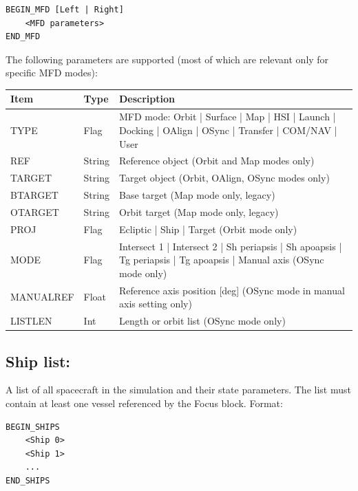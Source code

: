 \documentclass[Orbiter Developer Manual.tex]{subfiles}
\begin{document}
\begin{lstlisting}[language=OSFS]
BEGIN_MFD [Left | Right]
	<MFD parameters>
END_MFD
\end{lstlisting}

\noindent
The following parameters are supported (most of which are relevant only for specific MFD modes):

\begin{table}[H]
	\centering
	\begin{tabularx}{\textwidth}{ |l|l|X| }
	\hline\rule{0pt}{2ex}
	\textbf{Item} & \textbf{Type} & \textbf{Description}\\
	\hline\rule{0pt}{2ex}
	TYPE & Flag & MFD mode: Orbit | Surface | Map | HSI | Launch | Docking | OAlign | OSync | Transfer | COM/NAV | User\\
	\hline\rule{0pt}{2ex}
	REF & String & Reference object (Orbit and Map modes only)\\
	\hline\rule{0pt}{2ex}
	TARGET & String & Target object (Orbit, OAlign, OSync modes only)\\
	\hline\rule{0pt}{2ex}
	BTARGET & String & Base target (Map mode only, legacy)\\
	\hline\rule{0pt}{2ex}
	OTARGET & String & Orbit target (Map mode only, legacy)\\
	\hline\rule{0pt}{2ex}
	PROJ & Flag & Ecliptic | Ship | Target (Orbit mode only)\\
	\hline\rule{0pt}{2ex}
	MODE & Flag & Intersect 1 | Intersect 2 | Sh periapsis | Sh apoapsis | Tg periapsis | Tg apoapsis | Manual axis (OSync mode only)\\
	\hline\rule{0pt}{2ex}
	MANUALREF & Float & Reference axis position [deg] (OSync mode in manual axis setting only)\\
	\hline\rule{0pt}{2ex}
	LISTLEN & Int & Length or orbit list (OSync mode only)\\
	\hline
	\end{tabularx}
\end{table}

\subsection*{Ship list:}
A list of all spacecraft in the simulation and their state parameters. The list must contain at least one vessel referenced by the Focus block. Format:

\begin{lstlisting}[language=OSFS]
BEGIN_SHIPS
	<Ship 0>
	<Ship 1>
	...
END_SHIPS
\end{lstlisting}
\end{document}
